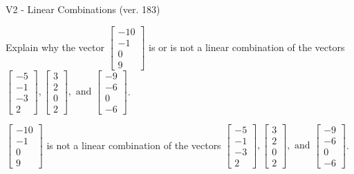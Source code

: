 \begin{exercise}
  \begin{exerciseTitle}V2 - Linear Combinations (ver. 183)\end{exerciseTitle}
  \begin{exerciseStatement}
    Explain why the vector \(\left[\begin{array}{c}
-10 \\
-1 \\
0 \\
9
\end{array}\right]\)  is or is not a linear 
	combination of the vectors \(\left[\begin{array}{c}
-5 \\
-1 \\
-3 \\
2
\end{array}\right] , \left[\begin{array}{c}
3 \\
2 \\
0 \\
2
\end{array}\right] , \text{ and } \left[\begin{array}{c}
-9 \\
-6 \\
0 \\
-6
\end{array}\right]\).
	


  \end{exerciseStatement}
  \begin{exerciseAnswer}
   \(\left[\begin{array}{c}
-10 \\
-1 \\
0 \\
9
\end{array}\right]\) 
  	 is not  
	a linear combination of the vectors \(\left[\begin{array}{c}
-5 \\
-1 \\
-3 \\
2
\end{array}\right] , \left[\begin{array}{c}
3 \\
2 \\
0 \\
2
\end{array}\right] , \text{ and } \left[\begin{array}{c}
-9 \\
-6 \\
0 \\
-6
\end{array}\right]\).

	
  


  \end{exerciseAnswer}
\end{exercise}